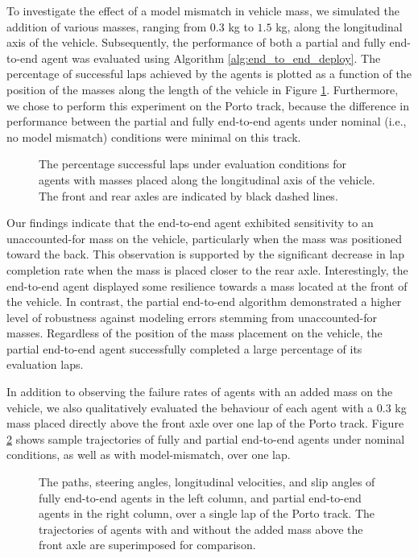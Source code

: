 To investigate the effect of a model mismatch in vehicle mass, we simulated the addition of various masses, ranging from $0.3$ kg to $1.5$ kg, along the longitudinal axis of the vehicle.
Subsequently, the performance of both a partial and fully end-to-end agent was evaluated using Algorithm \ref{alg:end_to_end_deploy}. 
The percentage of successful laps achieved by the agents is plotted as a function of the position of the masses along the length of the vehicle in Figure \ref{fig:unknown_mass}.
Furthermore, we chose to perform this experiment on the Porto track, because the difference in performance between the partial and fully end-to-end agents under nominal 
(i.e., no model mismatch) conditions were minimal on this track.

\begin{figure}[htb!]
    \centering
    
    \caption[Percentage successful laps under evaluation conditions for agents with masses placed along the longitudinal axis of the vehicle]{The percentage successful laps under evaluation conditions for agents with masses placed along the longitudinal axis of the vehicle. The front and rear axles are indicated by black dashed lines.}
    \label{fig:unknown_mass}
\end{figure}

Our findings indicate that the end-to-end agent exhibited sensitivity to an unaccounted-for mass on the vehicle, particularly when the mass was positioned toward the back. 
This observation is supported by the significant decrease in lap completion rate when the mass is placed closer to the rear axle. 
Interestingly, the end-to-end agent displayed some resilience towards a mass located at the front of the vehicle. 
In contrast, the partial end-to-end algorithm demonstrated a higher level of robustness against modeling errors stemming from unaccounted-for masses. 
Regardless of the position of the mass placement on the vehicle, the partial end-to-end agent successfully completed a large percentage of its evaluation laps.

In addition to observing the failure rates of agents with an added mass on the vehicle, we also qualitatively evaluated the behaviour of each agent with a $0.3$ kg mass placed directly above the front axle over one lap of the Porto track.
Figure \ref{fig:unknown_mass_trajs_2} shows sample trajectories of fully and partial end-to-end agents under nominal conditions, as well as with model-mismatch, over one lap.

\begin{figure}[htb!]
    \centering
    
    \caption[Trajectories of agents racing with and without an accounted for mass placed above the front axle]{The paths, steering angles, longitudinal velocities, and slip angles of fully end-to-end agents in the left column, and partial end-to-end agents in the right column, over a single lap of the Porto track. The trajectories of agents with and without the added mass above the front axle are superimposed for comparison.}
    \label{fig:unknown_mass_trajs_2}
\end{figure}

